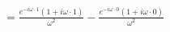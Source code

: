\documentclass[preview]{standalone}
\begin{document}
\begin{align*}
&=\frac{e^{-i\omega\cdot 1}(1+i\omega\cdot 1)}{\omega^{2}}-\frac{e^{-i\omega\cdot 0}(1+i\omega\cdot 0)}{\omega^{2}} \\
\end{align*}
\end{document}
